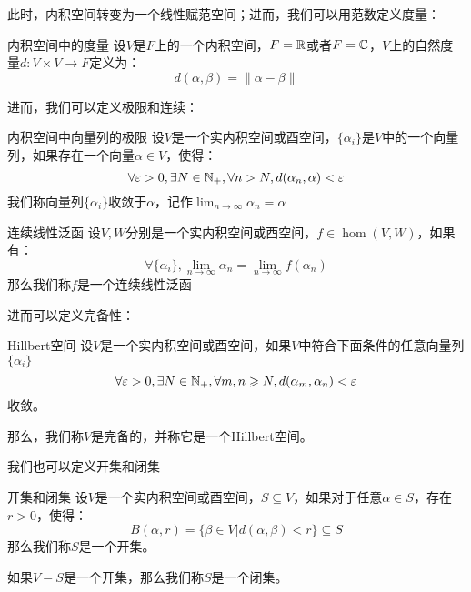 \documentclass[12pt, a4paper, oneside, UTF8]{ctexbook}
\begin{document}
			此时，内积空间转变为一个线性赋范空间；进而，我们可以用范数定义度量：
			\begin{defn}{内积空间中的度量}{}
				设$V$是$F$上的一个内积空间，$F=\mathbb{R}$或者$F=\mathbb{C}$，$V$上的自然度量$d:V \times V \to F$定义为：
				\begin{equation}
					d(\alpha ,\beta )=\|\alpha -\beta \|
				\end{equation}
			\end{defn}
			进而，我们可以定义极限和连续：
			\begin{defn}{内积空间中向量列的极限}{}
				设$V$是一个实内积空间或酉空间，$\{\alpha_i\}$是$V$中的一个向量列，如果存在一个向量$\alpha \in V$，使得：
				\begin{equation}
					\forall \varepsilon > 0,\exists N \in \mathbb{N}_+,\forall n > N,d(\alpha_n,\alpha ) < \varepsilon 
				\end{equation}
				我们称向量列$\{\alpha_i\}$收敛于$\alpha $，记作$\lim_{n \to \infty}\alpha_n=\alpha $
			\end{defn}
			\begin{defn}{连续线性泛函}{}
				设$V,W$分别是一个实内积空间或酉空间，$f \in \hom(V,W)$，如果有：
				\begin{equation}
					\forall \{\alpha_i\},\lim_{n \to \infty}\alpha_n=\lim_{n \to \infty}f(\alpha_n)
				\end{equation}
				那么我们称$f$是一个连续线性泛函
			\end{defn}
			进而可以定义完备性：
			\begin{defn}{Hillbert空间}{}
				设$V$是一个实内积空间或酉空间，如果$V$中符合下面条件的任意向量列$\{\alpha_i\}$
				\begin{equation}
					\forall \varepsilon > 0,\exists N \in \mathbb{N}_+,\forall m,n \geqslant N,d(\alpha_m,\alpha_n) < \varepsilon 
				\end{equation}
				收敛。

				那么，我们称$V$是完备的，并称它是一个Hillbert空间。
			\end{defn}
			我们也可以定义开集和闭集
			\begin{defn}{开集和闭集}{}
				设$V$是一个实内积空间或酉空间，$S \subseteq V$，如果对于任意$\alpha \in S$，存在$r > 0$，使得：
				\begin{equation}
					B(\alpha ,r)=\{\beta \in V | d(\alpha ,\beta ) < r\} \subseteq S
				\end{equation}
				那么我们称$S$是一个开集。

				如果$V-S$是一个开集，那么我们称$S$是一个闭集。
			\end{defn}
\end{document}
